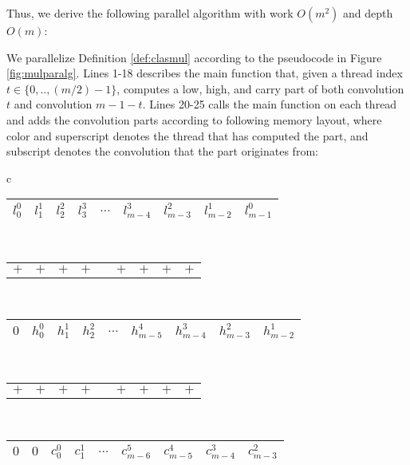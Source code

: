 Thus, we derive the following parallel algorithm with work $O(m^2)$ and depth
$O(m)$:

\begin{definition}\label{def:convmul}
  We parallelize Definition \ref{def:clasmul} according to the pseudocode in
  Figure \ref{fig:mulparalg}. Lines 1-18 describes the main function that, given
  a thread index ${t\in \{0,..,(m/2)-1\}}$, computes a low, high, and carry part
  of both convolution $t$ and convolution $m-1-t$. Lines 20-25 calls the main
  function on each thread and adds the convolution parts according to following
  memory layout, where color and superscript denotes the thread that has
  computed the part, and subscript denotes the convolution that the part
  originates from:
\begin{center}
  \small
  \begin{tabular}{c}
    \begin{tabular}{|C{0.8cm}|C{0.8cm}|C{0.8cm}|C{0.8cm}|C{0.5cm}|C{0.8cm}|C{0.8cm}|C{0.8cm}|C{0.8cm}|}
      \hline
      \red $l^0_0$ & \blue $l^1_1$ & \green $l^2_2$ & \brown $l^3_3$ & $\ldots$ & \brown $l^3_{m-4}$ & \green $l^2_{m-3}$ & \blue $l^1_{m-2}$ & \red $l^0_{m-1}$\\
      \hline
    \end{tabular}\\[-0.3ex]
    \begin{tabular}{C{0.81cm}C{0.81cm}C{0.81cm}C{0.81cm}C{0.51cm}C{0.81cm}C{0.81cm}C{0.81cm}C{0.81cm}}
      $+$ & $+$ & $+$ & $+$ &  & $+$ & $+$ & $+$ & $+$
    \end{tabular}\\[-0.3ex]
    \begin{tabular}{|C{0.8cm}|C{0.8cm}|C{0.8cm}|C{0.8cm}|C{0.5cm}|C{0.8cm}|C{0.8cm}|C{0.8cm}|C{0.8cm}|}
      \hline
      $0$ & \red $h^0_0$ & \blue $h^1_1$ & \green $h^2_2$ & $\ldots$ & \color{magenta} $h^{4}_{m-5}$ & \brown $h^{3}_{m-4}$ & \green $h^{2}_{m-3}$ & \blue $h^1_{m-2}$\\
      \hline
    \end{tabular}\\[-0.3ex]
    \begin{tabular}{C{0.81cm}C{0.81cm}C{0.81cm}C{0.81cm}C{0.51cm}C{0.81cm}C{0.81cm}C{0.81cm}C{0.81cm}}
      $+$ & $+$ & $+$ & $+$ &  & $+$ & $+$ & $+$ & $+$
    \end{tabular}\\[-0.3ex]
    \begin{tabular}{|C{0.8cm}|C{0.8cm}|C{0.8cm}|C{0.8cm}|C{0.5cm}|C{0.8cm}|C{0.8cm}|C{0.8cm}|C{0.8cm}|}
      \hline
      $0$ & $0$ & \red $c^{0}_0$ & \blue $c^{1}_1$ & $\ldots$ & \color{cyan} $c^{5}_{m-6}$ & \color{magenta} $c^{4}_{m-5}$ & \brown $c^{3}_{m-4}$ & \green $c^{2}_{m-3}$\\
      \hline
    \end{tabular}
  \end{tabular}
\end{center}
\end{definition}~

